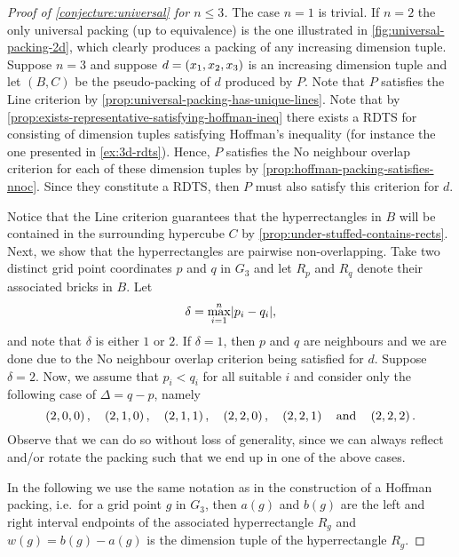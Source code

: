 \begin{proof}[Proof of \cref{conjecture:universal} for $n \leq 3$]
The case $n = 1$ is trivial. If $n = 2$ the only universal packing (up to equivalence) is the one illustrated in \cref{fig:universal-packing-2d}, which clearly produces a packing of any increasing dimension tuple. Suppose $n = 3$ and suppose $d = \left( x_1, x_2, x_3 \right)$ is an increasing dimension tuple and let $(B, C)$ be the pseudo-packing of $d$ produced by $P$. Note that $P$ satisfies the Line criterion  by \cref{prop:universal-packing-has-unique-lines}. Note that by \cref{prop:exists-representative-satisfying-hoffman-ineq} there exists a RDTS for consisting of dimension tuples satisfying Hoffman's inequality (for instance the one presented in \cref{ex:3d-rdts}). Hence, $P$ satisfies the No neighbour overlap criterion  for each of these dimension tuples by \cref{prop:hoffman-packing-satisfies-nnoc}. Since they constitute a RDTS, then $P$ must also satisfy this criterion for $d$.

Notice that the Line criterion  guarantees that the hyperrectangles in $B$ will be contained in the surrounding hypercube $C$ by \cref{prop:under-stuffed-contains-rects}. Next, we show that the hyperrectangles are pairwise non-overlapping. Take two distinct grid point coordinates $p$ and $q$ in $G_3$ and let $R_p$ and $R_q$ denote their associated bricks in $B$. Let
\[
\delta = \max_{i = 1}^{n} \lvert p_i - q_i\rvert,
\]
and note that $\delta$ is either $1$ or $2$. If $\delta = 1$, then $p$ and $q$ are neighbours and we are done due to the No neighbour overlap criterion  being satisfied for $d$. Suppose $\delta = 2$. Now, we assume that $p_i < q_i$ for all suitable $i$ and consider only the following case of $\Delta = q - p$, namely
\[
\left( 2, 0, 0 \right), \quad \left( 2, 1, 0 \right), \quad \left( 2, 1, 1 \right), \quad
\left( 2, 2, 0 \right), \quad \left( 2, 2, 1 \right) \quad \text{and} \quad \left( 2, 2, 2 \right).
\]
Observe that we can do so without loss of generality, since we can always reflect and/or rotate the packing such that we end up in one of the above cases.

In the following we use the same notation as in the construction of a Hoffman packing, i.e.\ for a grid point $g$ in $G_3$, then $a(g)$ and $b(g)$ are the left and right interval endpoints of the associated hyperrectangle $R_g$ and $w(g) = b(g) - a(g)$ is the dimension tuple of the hyperrectangle $R_g$.


\end{proof}
